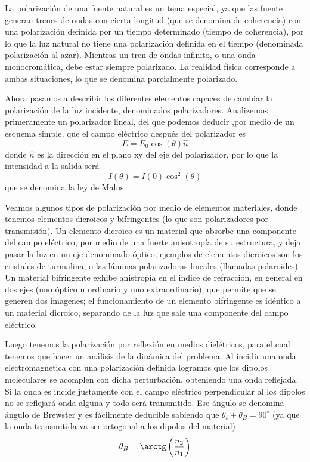\documentclass[a4paper]{article}
\numberwithin{equation}{section}
\begin{document}
	La polarización de una fuente natural es un tema especial, ya que las fuente generan trenes de ondas con cierta longitud (que se denomina de coherencia) con una polarización definida por un tiempo determinado (tiempo de coherencia), por lo que la luz natural no tiene una polarización definida en el tiempo (denominada polarización al azar). Mientras un tren de ondas infinito, o una onda monocromática, debe estar siempre polarizado. La realidad física corresponde a ambas situaciones, lo que se denomina parcialmente polarizado.
	
	Ahora pasamos a describir los diferentes elementos capaces de cambiar la polarización de la luz incidente, denominados polarizadores. Analizemos primeramente un polarizador lineal, del que podemos deducir ,por medio de un esquema simple, que el campo eléctrico después del polarizador es \[E = E_0 \cos(\theta) \hat{n}\] donde $\hat{n}$ es la dirección en el plano xy del eje del polarizador, por lo que la intensidad a la salida será
	\begin{equation}
		I(\theta) = I(0) \cos^2(\theta)
		\label{eq:polarizacion_malus}
	\end{equation}
	que se denomina la ley de Malus. 
	
	Veamos algunos tipos de polarización por medio de elementos materiales, donde tenemos elementos dicroicos y bifringentes (lo que son polarizadores por transmisión). Un elemento dicroico es un material que absorbe una componente del campo eléctrico, por medio de una fuerte anisotropía de su estructura, y deja pasar la luz en un eje denominado óptico; ejemplos de elementos dicroicos son los cristales de turmalina, o las láminas polarizadoras lineales (llamadas polaroides). Un material bifringente exhibe anistropía en el indice de refracción, en general en dos ejes (uno óptico u ordinario y uno extraordinario), que permite que se generen dos imagenes; el funcionamiento de un elemento bifringente es idéntico a un material dicroico, separando de la luz que sale una componente del campo eléctrico.
	
	Luego tenemos la polarización por reflexión en medios dielétricos, para el cual tenemos que hacer un análisis de la dinámica del problema. Al incidir una onda electromagnetica con una polarización definida logramos que los dipolos moleculares se acomplen con dicha perturbación, obteniendo una onda reflejada. Si la onda es incide justamente con el campo eléctrico perpendicular al los dipolos no se reflejará onda alguna y todo será transmitido. Ese ángulo se denomina ángulo de Brewster y es fácilmente deducible sabiendo que $\theta_t + \theta_B = 90^\circ$ (ya que la onda transmitida va ser ortogonal a los dipolos del material)
	\begin{equation}
		\theta_B = \arctg\left(\frac{n_2}{n_1}\right)
		\label{eq:polarizacion_brewster}
	\end{equation}
	
\end{document}
